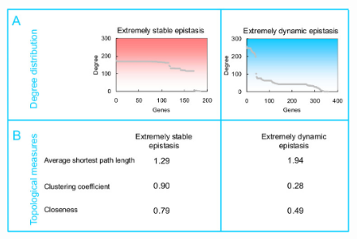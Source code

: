 \documentclass{article}
\begin{document}
\begin{figure}[H]
\caption{}
\label{fig:eef4}
\centering
\includegraphics[width=\textwidth]{envFigure_4}
\end{figure}
\end{document}
